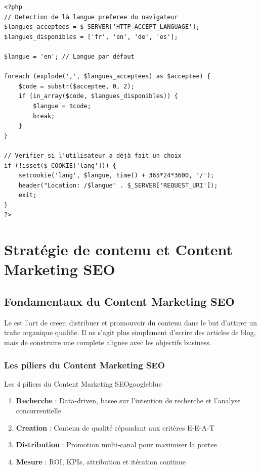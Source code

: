 \begin{lstlisting}[style=code,caption={Detection de là langue cote serveur avec PHP}]
<?php
// Detection de là langue preferee du navigateur
$langues_acceptees = $_SERVER['HTTP_ACCEPT_LANGUAGE'];
$langues_disponibles = ['fr', 'en', 'de', 'es'];

$langue = 'en'; // Langue par défaut

foreach (explode(',', $langues_acceptees) as $acceptee) {
    $code = substr($acceptee, 0, 2);
    if (in_array($code, $langues_disponibles)) {
        $langue = $code;
        break;
    }
}

// Verifier si l'utilisateur a déjà fait un choix
if (!isset($_COOKIE['lang'])) {
    setcookie('lang', $langue, time() + 365*24*3600, '/');
    header("Location: /$langue" . $_SERVER['REQUEST_URI']);
    exit;
}
?>
\end{lstlisting}


\chapter{Stratégie de contenu et Content Marketing SEO}
\label{ch:contentstrategy}

\section{Fondamentaux du Content Marketing SEO}

Le  est l'art de creer, distribuer et promouvoir du contenu dans le but d'attirer un trafic organique qualifie. Il ne s'agit plus simplement d'ecrire des articles de blog, mais de construire une  complete alignee avec les objectifs business.

\subsection{Les piliers du Content Marketing SEO}

\begin{mybox}{Les 4 piliers du Content Marketing SEO}{googleblue}
\begin{enumerate}
    \item \textbf{Recherche} : Data-driven, basee sur l'intention de recherche et l'analyse concurrentielle
    \item \textbf{Creation} : Contenu de qualité répondant aux critères E-E-A-T
    \item \textbf{Distribution} : Promotion multi-canal pour maximiser la portee
    \item \textbf{Mesure} : ROI, KPIs, attribution et itération continue
\end{enumerate}
\end{mybox}

